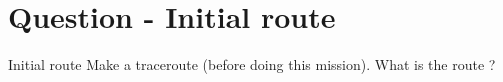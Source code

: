 \section{Question - Initial route}

\begin{questionBox}{Initial route}
    Make a traceroute (before doing this mission). What is the route ?
\end{questionBox}
